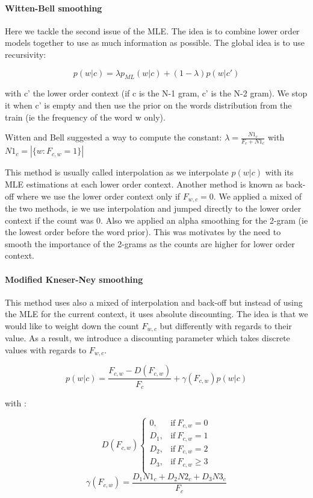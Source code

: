 \documentclass[11pt]{article}
\begin{document}
\paragraph{Witten-Bell smoothing}

Here we tackle the second issue of the MLE. The idea is to combine lower order models together to use as much information as possible. The global idea is to use recursivity: 

\[
	p(w|c) = \lambda p_{ML}(w|c) + (1 - \lambda)p(w|c')
\]

with c' the lower order context (if c is the N-1 gram, c' is the N-2 gram). We stop it when c' is empty and then use the prior on the words distribution from the train (ie the frequency of the word w only). 

Witten and Bell suggested a way to compute the constant: $\lambda = \frac{N1_c}{F_c + N1_c}$ with $N1_c = |\{w: F_{c, w} = 1\}|$

This method is usually called interpolation as we interpolate $p(w|c)$ with its MLE estimations at each lower order context. Another method is known as back-off where we use the lower order context only if $F_{w,c} = 0$. We applied a mixed of the two methods, ie we use interpolation and jumped directly to the lower order context if the count was 0. Also we applied an alpha smoothing for the 2-gram (ie the lowest order before the word prior). This was motivates by the need to smooth the importance of the 2-grams as the counts are higher for lower order context.

\paragraph{Modified Kneser-Ney smoothing}

This method uses also a mixed of interpolation and back-off but instead of using the MLE for the current context, it uses absolute discounting. The idea is that we would like to weight down the count $F_{w,c}$ but differently with regards to their value. As a result, we introduce a discounting parameter which takes discrete values with regards to $F_{w,c}$.

\[
	p(w|c) = \frac{F_{c,w} - D(F_{c,w})}{F_c} + \gamma(F_{c,w}) p(w|c)
\]

with :

\[
D(F_{c,w})
    \begin{cases}
      0, & \text{if}\ F_{c,w}=0 \\
      D_1, & \text{if}\ F_{c,w}=1 \\
      D_2, & \text{if}\ F_{c,w}=2 \\
      D_3, & \text{if}\ F_{c,w} \geq 3 \\
    \end{cases}
\]
\[
\gamma(F_{c,w}) = \frac{D_1N1_c + D_2N2_c + D_3N3_c}{F_c}
\]
\end{document}
